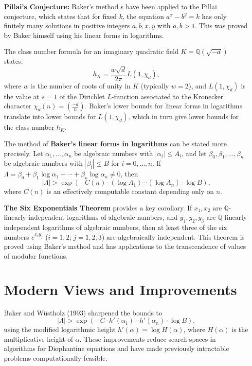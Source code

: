 \textbf{Pillai's Conjecture:} Baker's method \cite{baker1966}s have been applied to the Pillai conjecture, which states that for fixed $k$, the equation $a^x - b^y = k$ has only finitely many solutions in positive integers $a, b, x, y$ with $a, b > 1$. This was proved by Baker himself using his linear forms in logarithms.

The class number formula for an imaginary quadratic field $K = \mathbb{Q}(\sqrt{-d})$ states:
\[
h_K = \frac{w\sqrt{d}}{2\pi} L(1, \chi_d),
\]
where $w$ is the number of roots of unity in $K$ (typically $w = 2$), and $L(1, \chi_d)$ is the value at $s = 1$ of the Dirichlet $L$-function associated to the Kronecker character $\chi_d(n) = \left(\frac{-d}{n}\right)$. Baker's lower bounds for linear forms in logarithms translate into lower bounds for $L(1, \chi_d)$, which in turn give lower bounds for the class number $h_K$.

The method of \textbf{Baker's linear forms in logarithms} can be stated more precisely. Let $\alpha_1, \ldots, \alpha_n$ be algebraic numbers with $|\alpha_i| \leq A_i$, and let $\beta_0, \beta_1, \ldots, \beta_n$ be algebraic numbers with $|\beta_i| \leq B$ for $i = 0, \ldots, n$. If $\Lambda = \beta_0 + \beta_1 \log \alpha_1 + \cdots + \beta_n \log \alpha_n \neq 0$, then
\[
|\Lambda| > \exp\left(-C(n) \cdot (\log A_1) \cdots (\log A_n) \cdot \log B\right),
\]
where $C(n)$ is an effectively computable constant depending only on $n$.

\textbf{The Six Exponentials Theorem} provides a key corollary. If $x_1, x_2$ are $\mathbb{Q}$-linearly independent logarithms of algebraic numbers, and $y_1, y_2, y_3$ are $\mathbb{Q}$-linearly independent logarithms of algebraic numbers, then at least three of the six numbers $e^{x_i y_j}$ ($i = 1, 2$; $j = 1, 2, 3$) are algebraically independent. This theorem is proved using Baker's method \cite{baker1966} and has applications to the transcendence of values of modular functions.

\section{Modern Views and Improvements}

Baker and W\"{u}stholz (1993) sharpened the bounds to
\[
|\Lambda| > \exp(-C \cdot h'(\alpha_1) \cdots h'(\alpha_n) \cdot \log B),
\]
using the modified logarithmic height $h'(\alpha) = \log H(\alpha)$, where $H(\alpha)$ is the multiplicative height of $\alpha$. These improvements reduce search spaces in algorithms for Diophantine equations and have made previously intractable problems computationally feasible.

